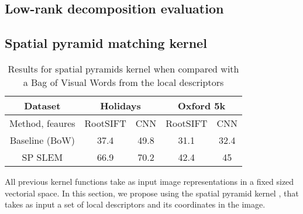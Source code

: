 \vspace{3 mm}



\subsection{Low-rank decomposition evaluation}



\subsection{Spatial pyramid matching kernel}

\begin{table}[!h]
    \centering
    \caption{Results for spatial pyramids kernel when compared with a Bag of Visual Words from the local descriptors}
    \begin{tabular}{|c|c|c|c|c|}
    \hline
    Dataset & \multicolumn{2}{|c|}{\textbf{Holidays}} & \multicolumn{2}{|c|}{\textbf{Oxford 5k}}\\
    \hline
        Method, feaures & RootSIFT & CNN & RootSIFT
        &CNN \\
    \hline
    \hline
    Baseline (BoW) & 37.4 & 49.8 & 31.1 & 32.4 \\
        SP SLEM    & 66.9 & 70.2 & 42.4 & 45 \\
    \hline
    \end{tabular}
    \label{tab:spk}
\end{table}
All previous kernel functions take as input image representations in a fixed sized vectorial space. In this section, we propose using the spatial pyramid kernel \cite{GrauDa05}, that takes as input a set of local descriptors and its coordinates in the image.


